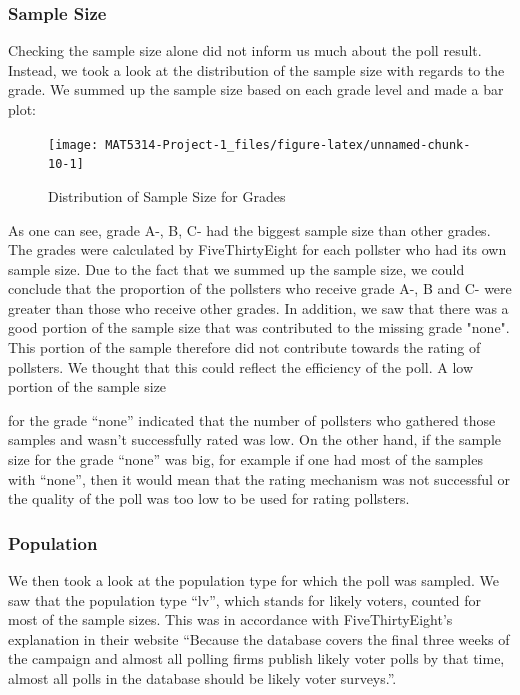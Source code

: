 \documentclass[
  11pt,
]{article}
\begin{document}
\hypertarget{sample-size}{%
\subsubsection{Sample Size}\label{sample-size}}

Checking the sample size alone did not inform us much about the poll
result. Instead, we took a look at the distribution of the sample size
with regards to the grade. We summed up the sample size based on each
grade level and made a bar plot:

\begin{minipage}[t]{0.55\textwidth}
\begin{figure}
\texttt{[image: MAT5314-Project-1\_files/figure-latex/unnamed-chunk-10-1]} \caption{Distribution of Sample Size for Grades}\label{fig:unnamed-chunk-10}
\end{figure}
\end{minipage}
\begin{minipage}[t]{0.45\textwidth}
\vspace{0pt}
As one can see, grade A-, B, C- had the biggest sample size than other grades. The grades were calculated by FiveThirtyEight for each pollster who had its own sample size. Due to the fact that we summed up the sample size, we could conclude that the proportion of the pollsters who receive grade A-, B and C- were greater than those who receive other grades. In addition, we saw that there was a good portion of the sample size that was contributed to the missing grade "none". This portion of the sample therefore did not contribute towards the rating of pollsters. We thought that this could reflect the efficiency of the poll. A low portion of the sample size 
\end{minipage}

for the grade ``none'' indicated that the number of pollsters who
gathered those samples and wasn't successfully rated was low. On the
other hand, if the sample size for the grade ``none'' was big, for
example if one had most of the samples with ``none'', then it would mean
that the rating mechanism was not successful or the quality of the poll
was too low to be used for rating pollsters.

\hypertarget{population}{%
\subsubsection{Population}\label{population}}

We then took a look at the population type for which the poll was
sampled. We saw that the population type ``lv'', which stands for likely
voters, counted for most of the sample sizes. This was in accordance
with FiveThirtyEight's explanation in their website ``Because the
database covers the final three weeks of the campaign and almost all
polling firms publish likely voter polls by that time, almost all polls
in the database should be likely voter surveys.''.
\end{document}
